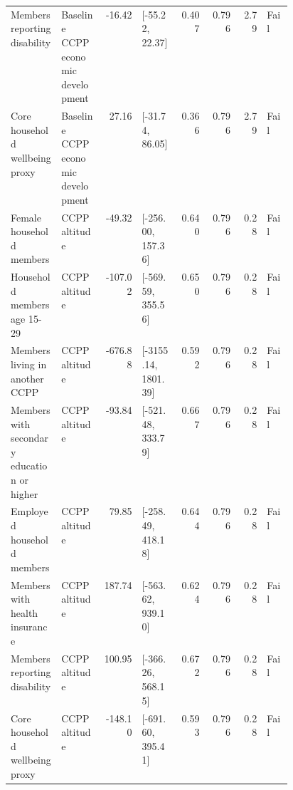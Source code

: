\begin{longtable}{@{}p{0.18\linewidth}p{0.15\linewidth}rp{0.13\linewidth}rrrl@{}}
Members reporting disability & Baseline CCPP economic development & -16.42 & [-55.22, 22.37] & 0.407 & 0.796 & 2.79 & Fail \\
Core household wellbeing proxy & Baseline CCPP economic development & 27.16 & [-31.74, 86.05] & 0.366 & 0.796 & 2.79 & Fail \\
Female household members & CCPP altitude & -49.32 & [-256.00, 157.36] & 0.640 & 0.796 & 0.28 & Fail \\
Household members age 15-29 & CCPP altitude & -107.02 & [-569.59, 355.56] & 0.650 & 0.796 & 0.28 & Fail \\
Members living in another CCPP & CCPP altitude & -676.88 & [-3155.14, 1801.39] & 0.592 & 0.796 & 0.28 & Fail \\
Members with secondary education or higher & CCPP altitude & -93.84 & [-521.48, 333.79] & 0.667 & 0.796 & 0.28 & Fail \\
Employed household members & CCPP altitude & 79.85 & [-258.49, 418.18] & 0.644 & 0.796 & 0.28 & Fail \\
Members with health insurance & CCPP altitude & 187.74 & [-563.62, 939.10] & 0.624 & 0.796 & 0.28 & Fail \\
Members reporting disability & CCPP altitude & 100.95 & [-366.26, 568.15] & 0.672 & 0.796 & 0.28 & Fail \\
Core household wellbeing proxy & CCPP altitude & -148.10 & [-691.60, 395.41] & 0.593 & 0.796 & 0.28 & Fail \\
\end{longtable}
\endgroup
